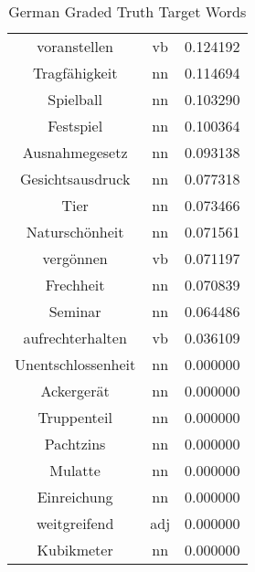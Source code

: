 \begin{table}[h]
\begin{tabular}{ccc}
voranstellen       & vb  & 0.124192         \\
Tragfähigkeit      & nn  & 0.114694         \\
Spielball          & nn  & 0.103290         \\
Festspiel          & nn  & 0.100364         \\
Ausnahmegesetz     & nn  & 0.093138         \\
Gesichtsausdruck   & nn  & 0.077318         \\
Tier               & nn  & 0.073466         \\
Naturschönheit     & nn  & 0.071561         \\
vergönnen          & vb  & 0.071197         \\
Frechheit          & nn  & 0.070839         \\
Seminar            & nn  & 0.064486         \\
aufrechterhalten   & vb  & 0.036109         \\
Unentschlossenheit & nn  & 0.000000         \\
Ackergerät         & nn  & 0.000000         \\
Truppenteil        & nn  & 0.000000         \\
Pachtzins          & nn  & 0.000000         \\
Mulatte            & nn  & 0.000000         \\
Einreichung        & nn  & 0.000000         \\
weitgreifend       & adj & 0.000000         \\
Kubikmeter         & nn  & 0.000000         \\
\bottomrule
\end{tabular}
\caption{German Graded Truth Target Words}
\label{tab:deu-truthtargets}
\end{table}

